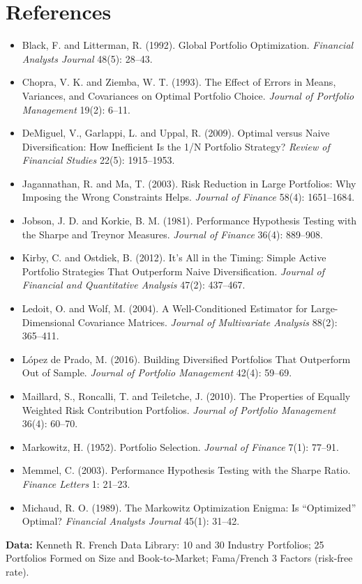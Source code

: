 \section*{References}

\begin{itemize}
  \item Black, F. and Litterman, R. (1992). Global Portfolio Optimization. \emph{Financial Analysts Journal} 48(5): 28--43.
  \item Chopra, V. K. and Ziemba, W. T. (1993). The Effect of Errors in Means, Variances, and Covariances on Optimal Portfolio Choice. \emph{Journal of Portfolio Management} 19(2): 6--11.
  \item DeMiguel, V., Garlappi, L. and Uppal, R. (2009). Optimal versus Naive Diversification: How Inefficient Is the 1/N Portfolio Strategy? \emph{Review of Financial Studies} 22(5): 1915--1953.
  \item Jagannathan, R. and Ma, T. (2003). Risk Reduction in Large Portfolios: Why Imposing the Wrong Constraints Helps. \emph{Journal of Finance} 58(4): 1651--1684.
  \item Jobson, J. D. and Korkie, B. M. (1981). Performance Hypothesis Testing with the Sharpe and Treynor Measures. \emph{Journal of Finance} 36(4): 889--908.
  \item Kirby, C. and Ostdiek, B. (2012). It's All in the Timing: Simple Active Portfolio Strategies That Outperform Naive Diversification. \emph{Journal of Financial and Quantitative Analysis} 47(2): 437--467.
  \item Ledoit, O. and Wolf, M. (2004). A Well-Conditioned Estimator for Large-Dimensional Covariance Matrices. \emph{Journal of Multivariate Analysis} 88(2): 365--411.
  \item L\'opez de Prado, M. (2016). Building Diversified Portfolios That Outperform Out of Sample. \emph{Journal of Portfolio Management} 42(4): 59--69.
  \item Maillard, S., Roncalli, T. and Teiletche, J. (2010). The Properties of Equally Weighted Risk Contribution Portfolios. \emph{Journal of Portfolio Management} 36(4): 60--70.
  \item Markowitz, H. (1952). Portfolio Selection. \emph{Journal of Finance} 7(1): 77--91.
  \item Memmel, C. (2003). Performance Hypothesis Testing with the Sharpe Ratio. \emph{Finance Letters} 1: 21--23.
  \item Michaud, R. O. (1989). The Markowitz Optimization Enigma: Is ``Optimized'' Optimal? \emph{Financial Analysts Journal} 45(1): 31--42.
\end{itemize}

\textbf{Data:} Kenneth R. French Data Library: 10 and 30 Industry Portfolios; 25 Portfolios Formed on Size and Book-to-Market; Fama/French 3 Factors (risk-free rate).
